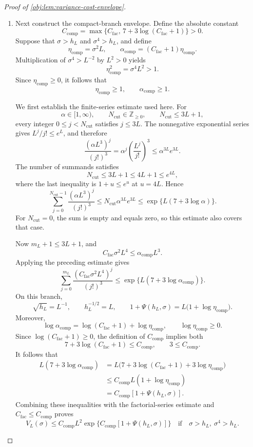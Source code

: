 \documentclass[11pt]{article}
\begin{document}
\begin{proof}[Proof of \cref{obj:lem:variance-cost-envelope}]
\begin{enumerate}
\item Next construct the compact-branch envelope. Define the absolute constant
\[
C_{\mathrm{comp}}
=\max\{C_{\mathrm{fac}},\,7+3\log(C_{\mathrm{fac}}+1)\}>0.
\]
Suppose that \(\sigma>h_L\) and \(\sigma^4>h_L\), and define
\[
\eta_{\mathrm{comp}}=\sigma^2L,
\qquad
\alpha_{\mathrm{comp}}=(C_{\mathrm{fac}}+1)\eta_{\mathrm{comp}}.
\]
Multiplication of \(\sigma^4>L^{-2}\) by \(L^2>0\) yields
\[
\eta_{\mathrm{comp}}^2=\sigma^4L^2>1.
\]
Since \(\eta_{\mathrm{comp}}\ge0\), it follows that
\[
\eta_{\mathrm{comp}}\ge1,
\qquad
\alpha_{\mathrm{comp}}\ge1.
\]

We first establish the finite-series estimate used here. For
\[
\alpha\in[1,\infty),
\qquad
N_{\mathrm{cut}}\in\mathbb Z_{\ge0},
\qquad
N_{\mathrm{cut}}\le3L+1,
\]
every integer \(0\le j<N_{\mathrm{cut}}\) satisfies \(j\le3L\).
The nonnegative exponential series gives \(L^j/j!\le e^L\), and therefore
\[
\frac{(\alpha L^3)^j}{(j!)^3}
=\alpha^j\left(\frac{L^j}{j!}\right)^3
\le \alpha^{3L}e^{3L}.
\]
The number of summands satisfies
\[
N_{\mathrm{cut}}\le3L+1\le4L+1\le e^{4L},
\]
where the last inequality is \(1+u\le e^u\) at \(u=4L\). Hence
\[
\sum_{j=0}^{N_{\mathrm{cut}}-1}
\frac{(\alpha L^3)^j}{(j!)^3}
\le N_{\mathrm{cut}}\alpha^{3L}e^{3L}
\le \exp\{L(7+3\log\alpha)\}.
\]
For \(N_{\mathrm{cut}}=0\), the sum is empty and equals zero, so this estimate
also covers that case.

Now \(m_L+1\le3L+1\), and
\[
C_{\mathrm{fac}}\sigma^2L^4
\le \alpha_{\mathrm{comp}}L^3.
\]
Applying the preceding estimate gives
\[
\sum_{j=0}^{m_L}
\frac{(C_{\mathrm{fac}}\sigma^2L^4)^j}{(j!)^3}
\le
\exp\{L(7+3\log\alpha_{\mathrm{comp}})\}.
\]
On this branch,
\[
\sqrt{h_L}=L^{-1},
\qquad
h_L^{-1/2}=L,
\qquad
1+\Psi(h_L,\sigma)
=L\bigl(1+\log\eta_{\mathrm{comp}}\bigr).
\]
Moreover,
\[
\log\alpha_{\mathrm{comp}}
=\log(C_{\mathrm{fac}}+1)+\log\eta_{\mathrm{comp}},
\qquad
\log\eta_{\mathrm{comp}}\ge0.
\]
Since \(\log(C_{\mathrm{fac}}+1)\ge0\), the definition of
\(C_{\mathrm{comp}}\) implies both
\[
7+3\log(C_{\mathrm{fac}}+1)\le C_{\mathrm{comp}},
\qquad
3\le C_{\mathrm{comp}}.
\]
It follows that
\[
\begin{aligned}
L(7+3\log\alpha_{\mathrm{comp}})
&=L\bigl(7+3\log(C_{\mathrm{fac}}+1)
            +3\log\eta_{\mathrm{comp}}\bigr)\\
&\le C_{\mathrm{comp}}L(1+\log\eta_{\mathrm{comp}})\\
&=C_{\mathrm{comp}}[1+\Psi(h_L,\sigma)].
\end{aligned}
\]
Combining these inequalities with the factorial-series estimate and
\(C_{\mathrm{fac}}\le C_{\mathrm{comp}}\) proves
\[
V_L(\sigma)\le C_{\mathrm{comp}}L^2
\exp\{C_{\mathrm{comp}}[1+\Psi(h_L,\sigma)]\}
\quad\text{if}\quad
\sigma>h_L,\ \sigma^4>h_L.
\]


\end{enumerate}
\end{proof}
\end{document}
